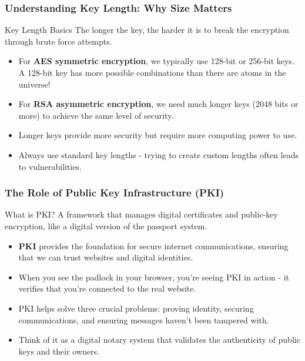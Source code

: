 \documentclass{beamer}
\begin{document}
\begin{frame}
    \frametitle{Understanding Key Length: Why Size Matters}
    
    \begin{alertblock}{Key Length Basics}
        The longer the key, the harder it is to break the encryption through brute force attempts.
    \end{alertblock}
    
    \begin{itemize}
        \item For \textbf{AES symmetric encryption}, we typically use 128-bit or 256-bit keys. A 128-bit key has more possible combinations than there are atoms in the universe!
        
        \item For \textbf{RSA asymmetric encryption}, we need much longer keys (2048 bits or more) to achieve the same level of security.
        
        \item Longer keys provide more security but require more computing power to use.
        
        \item Always use standard key lengths - trying to create custom lengths often leads to vulnerabilities.
    \end{itemize}
\end{frame}


\begin{frame}
    \frametitle{The Role of Public Key Infrastructure (PKI)}
    
    \begin{block}{What is PKI?}
        A framework that manages digital certificates and public-key encryption, like a digital version of the passport system.
    \end{block}
    
    \begin{itemize}
        \item \textbf{PKI} provides the foundation for secure internet communications, ensuring that we can trust websites and digital identities.
        
        \item When you see the padlock in your browser, you're seeing PKI in action - it verifies that you're connected to the real website.
        
        \item PKI helps solve three crucial problems: proving identity, securing communications, and ensuring messages haven't been tampered with.
        
        \item Think of it as a digital notary system that validates the authenticity of public keys and their owners.
    \end{itemize}
\end{frame}
\end{document}
